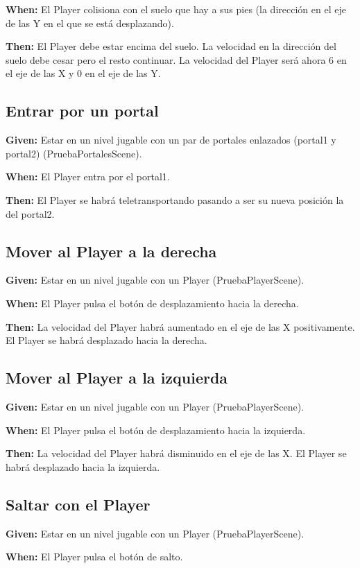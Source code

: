 \textbf{When:} El Player colisiona con el suelo que hay a sus pies (la dirección en el eje de las Y en el que se está desplazando).

\textbf{Then:} El Player debe estar encima del suelo. La velocidad en la dirección del suelo debe cesar pero el resto continuar. La velocidad del Player será ahora 6 en el eje de las X y 0 en el eje de las Y.

\subsection{Entrar por un portal}
\textbf{Given:} Estar en un nivel jugable con un par de portales enlazados (portal1 y portal2) (PruebaPortalesScene).

\textbf{When:} El Player entra por el portal1.

\textbf{Then:} El Player se habrá teletransportando pasando a ser su nueva posición la del portal2.

\subsection{Mover al Player a la derecha}
\textbf{Given:} Estar en un nivel jugable con un Player (PruebaPlayerScene).

\textbf{When:} El Player pulsa el botón de desplazamiento hacia la derecha.

\textbf{Then:} La velocidad del Player habrá aumentado en el eje de las X positivamente. El Player se habrá desplazado hacia la derecha.

\subsection{Mover al Player a la izquierda}
\textbf{Given:} Estar en un nivel jugable con un Player (PruebaPlayerScene).

\textbf{When:} El Player pulsa el botón de desplazamiento hacia la izquierda.

\textbf{Then:} La velocidad del Player habrá disminuido en el eje de las X. El Player se habrá desplazado hacia la izquierda.

\subsection{Saltar con el Player}
\textbf{Given:} Estar en un nivel jugable con un Player (PruebaPlayerScene).

\textbf{When:} El Player pulsa el botón de salto.

